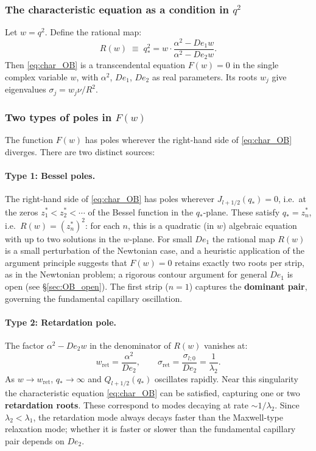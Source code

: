 \subsubsection{The characteristic equation as a condition in $q^2$}

Let $w = q^2$. Define the rational map:
\begin{equation}
  R(w) \;\equiv\; q_*^2
  = w\cdot\frac{\alpha^2 - De_1 w}{\alpha^2 - De_2 w}.
  \label{eq:R_map}
\end{equation}
Then \eqref{eq:char_OB} is a transcendental equation $F(w) = 0$ in the single
complex variable $w$, with $\alpha^2$, $De_1$, $De_2$ as real parameters.
Its roots $w_j$ give eigenvalues $\sigma_j = w_j\nu/R^2$.

\subsubsection{Two types of poles in $F(w)$}
\label{sec:two_pole_types}

The function $F(w)$ has poles wherever the right-hand side of
\eqref{eq:char_OB} diverges. There are two distinct sources:

\paragraph{Type 1: Bessel poles.}
The right-hand side of \eqref{eq:char_OB} has poles wherever
$J_{l+1/2}(q_*) = 0$, i.e.\ at the zeros $z_1^* < z_2^* < \cdots$ of the
Bessel function in the $q_*$-plane. These satisfy $q_* = z_n^*$, i.e.\
$R(w) = (z_n^*)^2$: for each $n$, this is a quadratic (in $w$) algebraic
equation with up to two solutions in the $w$-plane. For small $De_1$ the rational map $R(w)$ is a small perturbation of the
Newtonian case, and a heuristic application of the argument principle suggests
that $F(w) = 0$ retains exactly two roots per strip, as in the Newtonian
problem; a rigorous contour argument for general $De_1$ is open (see
\S\ref{sec:OB_open}). The first strip ($n=1$) captures the
\textbf{dominant pair}, governing the fundamental capillary oscillation.

\paragraph{Type 2: Retardation pole.}
The factor $\alpha^2 - De_2 w$ in the denominator of $R(w)$ vanishes at:
\begin{equation}
  w_{\mathrm{ret}} = \frac{\alpha^2}{De_2},
  \qquad
  \sigma_{\mathrm{ret}} = \frac{\sigma_{l;0}}{De_2} = \frac{1}{\lambda_2}.
  \label{eq:ret_pole}
\end{equation}
As $w \to w_{\mathrm{ret}}$, $q_* \to \infty$ and $Q_{l+1/2}(q_*)$ oscillates
rapidly. Near this singularity the characteristic equation
\eqref{eq:char_OB} can be satisfied, capturing one or two
\textbf{retardation roots}. These correspond to modes decaying at rate
$\sim 1/\lambda_2$. Since $\lambda_2 < \lambda_1$, the retardation mode
always decays faster than the Maxwell-type relaxation mode; whether it is
faster or slower than the fundamental capillary pair depends on $De_2$.

